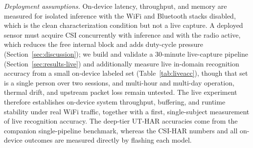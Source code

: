 \documentclass{ieeeaccess}
\begin{document}
\emph{Deployment assumptions.} On-device latency, throughput, and memory are measured for isolated inference with the WiFi and Bluetooth stacks disabled, which is the clean characterization condition but not a live capture. A deployed sensor must acquire CSI concurrently with inference and with the radio active, which reduces the free internal block and adds duty-cycle pressure (Section~\ref{sec:discussion}); we build and validate a 30-minute live-capture pipeline (Section~\ref{sec:results-live}) and additionally measure live in-domain recognition accuracy from a small on-device labeled set (Table~\ref{tab:liveacc}), though that set is a single person over two sessions, and multi-hour and multi-day operation, thermal drift, and upstream packet loss remain untested. The live experiment therefore establishes on-device system throughput, buffering, and runtime stability under real WiFi traffic, together with a first, single-subject measurement of live recognition accuracy. The deep-tier UT-HAR accuracies come from the companion single-pipeline benchmark, whereas the CSI-HAR numbers and all on-device outcomes are measured directly by flashing each model.
\end{document}

